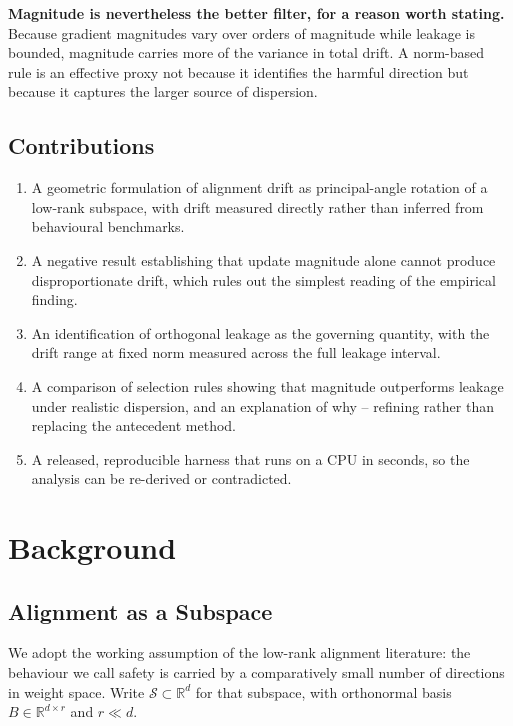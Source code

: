 \documentclass[10pt,journal,compsoc,twocolumn]{IEEEtran}
\begin{document}
\textbf{Magnitude is nevertheless the better filter, for a reason worth stating.} Because gradient magnitudes vary over orders of magnitude while leakage is bounded, magnitude carries more of the variance in total drift. A norm-based rule is an effective proxy not because it identifies the harmful direction but because it captures the larger source of dispersion.


\subsection{Contributions}


\begin{enumerate}
  \item A geometric formulation of alignment drift as principal-angle rotation of a low-rank subspace, with drift measured directly rather than inferred from behavioural benchmarks.
  \item A negative result establishing that update magnitude alone cannot produce disproportionate drift, which rules out the simplest reading of the empirical finding.
  \item An identification of orthogonal leakage as the governing quantity, with the drift range at fixed norm measured across the full leakage interval.
  \item A comparison of selection rules showing that magnitude outperforms leakage under realistic dispersion, and an explanation of why -- refining rather than replacing the antecedent method.
  \item A released, reproducible harness that runs on a CPU in seconds, so the analysis can be re-derived or contradicted.
\end{enumerate}




\section{Background}



\subsection{Alignment as a Subspace}


We adopt the working assumption of the low-rank alignment literature: the behaviour we call safety is carried by a comparatively small number of directions in weight space. Write $\mathcal{S} \subset \mathbb{R}^{d}$ for that subspace, with orthonormal basis $B \in \mathbb{R}^{d \times r}$ and $r \ll d$.
\end{document}
